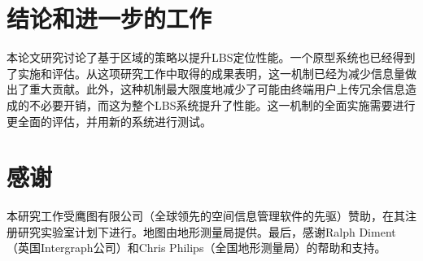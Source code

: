\documentclass{article}
\begin{document}
\begin{CJK}{UTF8}{gbsn}
	\section{结论和进一步的工作}
	本论文研究讨论了基于区域的策略以提升LBS定位性能。一个原型系统也已经得到了实施和评估。从这项研究工作中取得的成果表明，这一机制已经为减少信息量做出了重大贡献。此外，这种机制最大限度地减少了可能由终端用户上传冗余信息造成的不必要开销，而这为整个LBS系统提升了性能。这一机制的全面实施需要进行更全面的评估，并用新的系统进行测试。


	\section{感谢}
	本研究工作受鹰图有限公司（全球领先的空间信息管理软件的先驱）赞助，在其注册研究实验室计划下进行。地图由地形测量局提供。最后，感谢Ralph Diment（英国Intergraph公司）和Chris Philips（全国地形测量局）的帮助和支持。

	

	\end{CJK}
\end{document}

